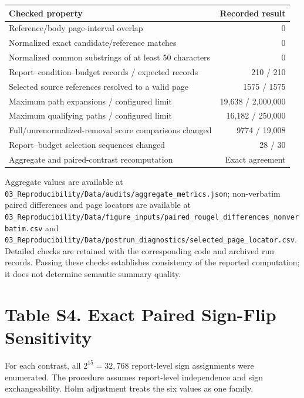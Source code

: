 \documentclass[11pt]{article}
\begin{document}
\begin{center}
\begin{tabularx}{\textwidth}{Xr}
\toprule
Checked property & Recorded result\\
\midrule
Reference/body page-interval overlap & 0\\
Normalized exact candidate/reference matches & 0\\
Normalized common substrings of at least 50 characters & 0\\
Report--condition--budget records / expected records & 210 / 210\\
Selected source references resolved to a valid page & 1575 / 1575\\
Maximum path expansions / configured limit & 19,638 / 2,000,000\\
Maximum qualifying paths / configured limit & 16,182 / 250,000\\
Full/unrenormalized-removal score comparisons changed & 9774 / 19,008\\
Report--budget selection sequences changed & 28 / 30\\
Aggregate and paired-contrast recomputation & Exact agreement\\
\bottomrule
\end{tabularx}
\end{center}

\begin{sloppypar}
Aggregate values are available at \nolinkurl{03_Reproducibility/Data/audits/aggregate_metrics.json}; non-verbatim paired differences and page locators are available at \nolinkurl{03_Reproducibility/Data/figure_inputs/paired_rougel_differences_nonverbatim.csv} and \nolinkurl{03_Reproducibility/Data/postrun_diagnostics/selected_page_locator.csv}. Detailed checks are retained with the corresponding code and archived run records. Passing these checks establishes consistency of the reported computation; it does not determine semantic summary quality.
\end{sloppypar}

\section*{Table S4. Exact Paired Sign-Flip Sensitivity}

For each contrast, all $2^{15}=32{,}768$ report-level sign assignments were enumerated. The procedure assumes report-level independence and sign exchangeability. Holm adjustment treats the six values as one family.
\end{document}

